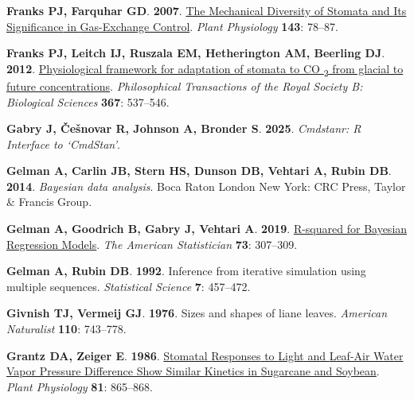 \documentclass[
  letterpaper,
  DIV=11,
  numbers=noendperiod]{scrartcl}
\newlength{\cslhangindent}
\newenvironment{CSLReferences}[2] %
 {\begin{list}{}{%
  \setlength{\itemindent}{0pt}
  \setlength{\leftmargin}{0pt}
  \setlength{\parsep}{0pt}
  \ifodd #1
   \setlength{\leftmargin}{\cslhangindent}
   \setlength{\itemindent}{-1\cslhangindent}
  \fi
  \setlength{\itemsep}{#2\baselineskip}}}
 {\end{list}}
\begin{document}
\begin{CSLReferences}{0}{1}
\textbf{\textbf{Franks PJ}, \textbf{Farquhar GD}}. \textbf{2007}.
\href{https://doi.org/10.1104/pp.106.089367}{The {Mechanical Diversity}
of {Stomata} and {Its Significance} in {Gas-Exchange Control}}.
\emph{Plant Physiology} \textbf{143}: 78--87.

\textbf{\textbf{Franks PJ}, \textbf{Leitch IJ}, \textbf{Ruszala EM},
\textbf{Hetherington AM}, \textbf{Beerling DJ}}. \textbf{2012}.
\href{https://doi.org/10.1098/rstb.2011.0270}{Physiological framework
for adaptation of stomata to {CO} {\textsubscript{2}} from glacial to
future concentrations}. \emph{Philosophical Transactions of the Royal
Society B: Biological Sciences} \textbf{367}: 537--546.

\textbf{\textbf{Gabry J}, \textbf{Češnovar R}, \textbf{Johnson A},
\textbf{Bronder S}}. \textbf{2025}. \emph{Cmdstanr: {R Interface} to
{`{CmdStan}'}}.

\textbf{\textbf{Gelman A}, \textbf{Carlin JB}, \textbf{Stern HS},
\textbf{Dunson DB}, \textbf{Vehtari A}, \textbf{Rubin DB}}.
\textbf{2014}. \emph{Bayesian data analysis}. Boca Raton London New
York: CRC Press, Taylor \& Francis Group.

\textbf{\textbf{Gelman A}, \textbf{Goodrich B}, \textbf{Gabry J},
\textbf{Vehtari A}}. \textbf{2019}.
\href{https://doi.org/10.1080/00031305.2018.1549100}{R-squared for
{Bayesian Regression Models}}. \emph{The American Statistician}
\textbf{73}: 307--309.

\textbf{\textbf{Gelman A}, \textbf{Rubin DB}}. \textbf{1992}. Inference
from iterative simulation using multiple sequences. \emph{Statistical
Science} \textbf{7}: 457--472.

\textbf{\textbf{Givnish TJ}, \textbf{Vermeij GJ}}. \textbf{1976}. Sizes
and shapes of liane leaves. \emph{American Naturalist} \textbf{110}:
743--778.

\textbf{\textbf{Grantz DA}, \textbf{Zeiger E}}. \textbf{1986}.
\href{https://doi.org/10.1104/pp.81.3.865}{Stomatal {Responses} to
{Light} and {Leaf-Air Water Vapor Pressure Difference Show Similar
Kinetics} in {Sugarcane} and {Soybean}}. \emph{Plant Physiology}
\textbf{81}: 865--868.


\end{CSLReferences}
\end{document}
